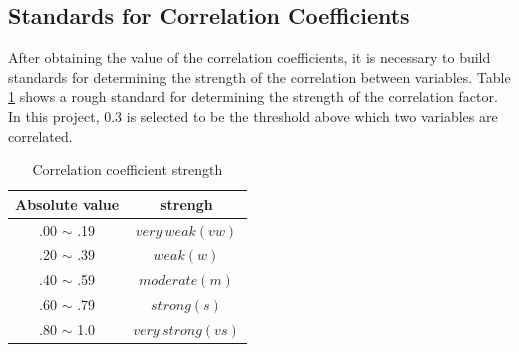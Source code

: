 \subsection{Standards for Correlation Coefficients}
\label{sect:threshold_0.3}
After obtaining the value of the correlation coefficients, it is necessary to build standards for determining the strength of the correlation between variables. Table \ref{tab:Correlation coefficient strength} shows a rough standard for determining the strength of the correlation factor. In this project, 0.3 is selected to be the threshold above which two variables are correlated.
    \begin{table}[!h]
        \centering
        \begin{tabular}{c|c}
            Absolute value & strengh\\ \hline
            .00 $\sim$ .19 &  $very \, weak(vw)$   \\
            .20 $\sim$ .39 &  $weak(w)$ \\
            .40 $\sim$ .59 & $moderate(m)$ \\
            .60 $\sim$ .79 & $strong(s)$ \\
            .80 $\sim$ 1.0 & $very \, strong(vs)$ \\
        \end{tabular}
        \caption{Correlation coefficient strength \cite{spearman_strength}}
        \label{tab:Correlation coefficient strength}
    \end{table}


